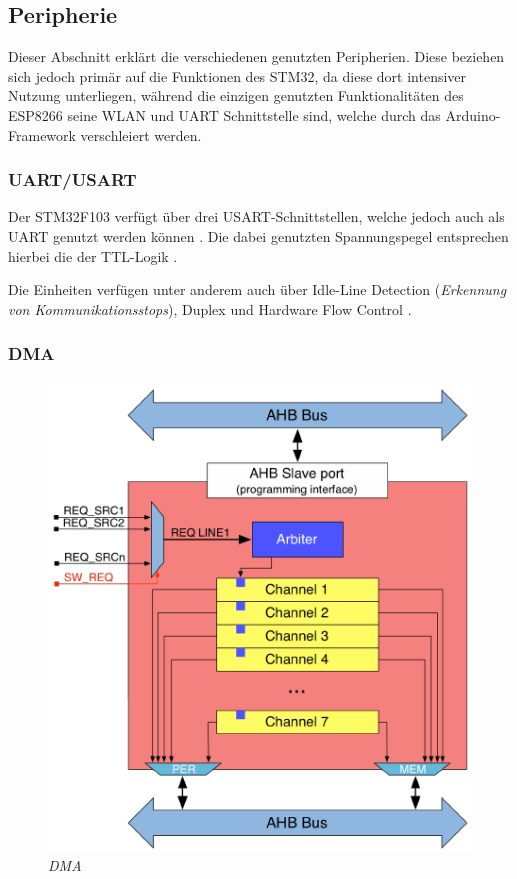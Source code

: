 \subsection{Peripherie}

Dieser Abschnitt erklärt die verschiedenen genutzten Peripherien. Diese beziehen sich jedoch primär auf die Funktionen des STM32, da diese
dort intensiver Nutzung unterliegen, während die einzigen genutzten Funktionalitäten des ESP8266 seine WLAN und UART Schnittstelle sind,
welche durch das Arduino-Framework verschleiert werden.

\subsubsection{UART/USART}

Der STM32F103 verfügt über drei \acs{USART}-Schnittstellen, welche jedoch auch als \ac{UART} genutzt werden können \citep{STM32_Datasheet}.
Die dabei genutzten Spannungspegel entsprechen hierbei die der TTL-Logik \citep{STM32_Datasheet}.

\smallskip

Die Einheiten verfügen unter anderem auch über Idle-Line Detection (\textit{Erkennung von Kommunikationsstops}), Duplex und Hardware Flow 
Control \citep{STM32_Ref}.




\subsubsection{DMA}

\begin{figure}
     \vspace{-\baselineskip}
         \centering
         \includegraphics[scale=0.3]{Pictures/dma_channel.png}
         \caption{\textit{DMA \citep{MasteringSTM}}}
         \label{img:DMA_Controller}
 \end{figure}

